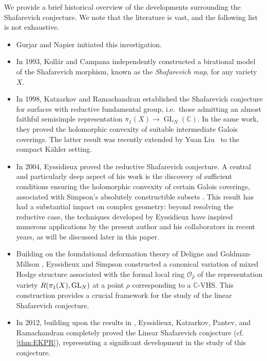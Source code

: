 \documentclass[english]{amsproc}
\theoremstyle{plain}
\theoremstyle{definition}
\theoremstyle{remark}
\theoremstyle{plain}
\numberwithin{equation}{thm} %
\newcommand{\GL}{{\rm GL}}
\begin{document}
We provide a brief historical overview of the developments surrounding the Shafarevich conjecture. We note that the literature is vast, and the following list is not exhaustive.

\begin{itemize} 
	\item Gurjar \cite{Gur85} and Napier \cite{Nap90}  initiated this investigation. 
	\item In 1993, Koll\'ar \cite{Kol93} and Campana \cite{Cam94} independently constructed a birational model of the Shafarevich morphism, known as the \emph{Shafarevich map}, for any variety $X$. 
	
	\item In 1998, Katzarkov and Ramachandran \cite{KR98} established the Shafarevich conjecture for surfaces with reductive fundamental group, i.e.\ those admitting an almost faithful semisimple representation $\pi_1(X) \to \operatorname{GL}_N(\mathbb{C})$. In the same work, they proved the holomorphic convexity of suitable intermediate Galois coverings. The latter result was recently  extended by Yuan Liu~\cite{Liu23} to the compact Kähler setting.
	
	\item In 2004, Eyssidieux \cite{Eys04} proved the reductive Shafarevich conjecture. 
	A central and particularly deep aspect of his work is the discovery of 
	sufficient conditions ensuring the holomorphic convexity of certain Galois coverings,
	associated with Simpson's absolutely constructible subsets \cite{Sim93b}. 
	This result has had a substantial impact on complex geometry: beyond resolving the 
	reductive case, the techniques developed by Eyssidieux have inspired numerous 
	applications by the present author and his collaborators in recent years, as will be discussed 
	later in this paper.
	
	\item Building on the foundational deformation theory of Deligne and Goldman-Millson \cite{GM88}, Eyssidieux and Simpson \cite{ES11} constructed a canonical variation of mixed Hodge structure associated with the formal local ring $\mathcal{O}_{\hat{\rho}}$ of the representation variety $R(\pi_{1}(X), \GL_{N})$ at a point $\rho$ corresponding to a $\mathbb{C}$-VHS. This construction provides a crucial framework for the study of the linear Shafarevich conjecture.
	
	\item In 2012, building upon the results in \cite{Eys04, ES11}, Eyssidieux, Katzarkov, Pantev, and Ramachandran \cite{EKPR12}  completely proved the Linear Shafarevich conjecture (cf. \cref{thm:EKPR}), representing a significant development in the study of this conjecture.
	

\end{itemize}
\end{document}
